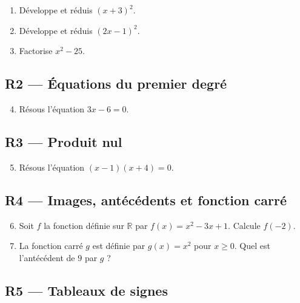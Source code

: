 \begin{enumerate}

  \item Développe et réduis $(x + 3)^2$.

  \item Développe et réduis $(2x - 1)^2$.

  \item Factorise $x^2 - 25$.

\end{enumerate}

\subsection*{R2 — Équations du premier degré}

\begin{enumerate}
  \setcounter{enumi}{3}

  \item Résous l'équation $3x - 6 = 0$.

\end{enumerate}

\subsection*{R3 — Produit nul}

\begin{enumerate}
  \setcounter{enumi}{4}

  \item Résous l'équation $(x - 1)(x + 4) = 0$.

\end{enumerate}

\subsection*{R4 — Images, antécédents et fonction carré}

\begin{enumerate}
  \setcounter{enumi}{5}

  \item Soit $f$ la fonction définie sur $\mathbb{R}$ par $f(x) = x^2 - 3x + 1$. Calcule $f(-2)$.

  \item La fonction carré $g$ est définie par $g(x) = x^2$ pour $x \geq 0$. Quel est l'antécédent de $9$ par $g$ ?

\end{enumerate}

\subsection*{R5 — Tableaux de signes}

